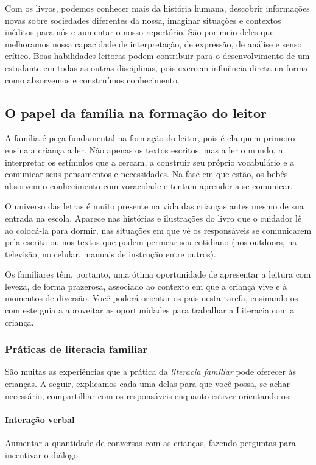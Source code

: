 \documentclass[11pt]{extarticle}
\begin{document}
Com os livros, podemos conhecer mais da história humana, descobrir informações 
novas sobre sociedades diferentes da nossa, imaginar situações e contextos inéditos 
para nós e aumentar o nosso repertório. São por meio deles que melhoramos nossa 
capacidade de interpretação, de expressão, de análise e senso crítico. Boas habilidades 
leitoras podem contribuir para o desenvolvimento de um estudante em todas as outras 
disciplinas, pois exercem influência direta na forma como absorvemos e 
construímos conhecimento.


\subsection{O papel da família na formação do leitor}
A família é peça fundamental na formação do leitor, pois é ela quem primeiro 
ensina a criança a ler. Não apenas os textos escritos, mas a ler o mundo, a 
interpretar os estímulos que a cercam, a construir seu próprio vocabulário e a 
comunicar seus pensamentos e necessidades. Na fase em que estão, os bebês 
absorvem o conhecimento com voracidade e tentam aprender a se comunicar. 

O universo das letras é muito presente na vida das crianças antes mesmo de sua 
entrada na escola. Aparece nas histórias e ilustrações do livro que o cuidador 
lê ao colocá-la para dormir, nas situações em que vê os responsáveis se comunicarem 
pela escrita ou nos textos que podem permear seu cotidiano (nos outdoors, na 
televisão, no celular, manuais de instrução entre outros). 

Os familiares têm, 
portanto, uma ótima oportunidade de apresentar a leitura com leveza, de forma 
prazerosa, associado ao contexto em que a criança vive e à momentos de diversão. 
Você poderá orientar os pais nesta tarefa, ensinando-os com este guia a aproveitar 
as oportunidades para trabalhar a Literacia com a criança.


\subsubsection{Práticas de literacia familiar} 

São muitas as experiências que a prática da \textit{literacia familiar} 
pode oferecer às crianças. A seguir, explicamos cada uma delas para que você possa, 
se achar necessário, compartilhar com os responsáveis enquanto estiver orientando-os: 

\paragraph{Interação verbal} Aumentar a quantidade de conversas com as 
crianças, fazendo perguntas para incentivar o diálogo.
\end{document}
